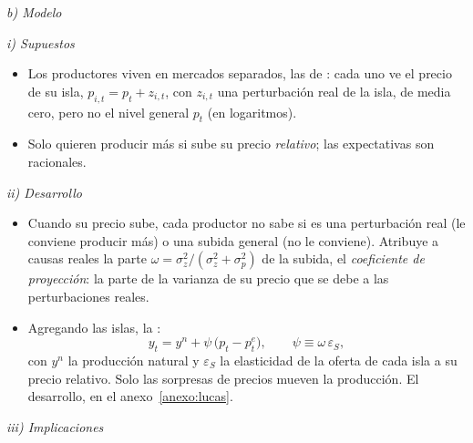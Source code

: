 \documentclass[11pt]{article}
\begin{document}
\hspace*{4.8em}\emph{b) Modelo}

\hspace*{6em}\emph{i) Supuestos}

\begin{itemize}
\item Los productores viven en mercados separados, las  de \textcite{Phelps1970Microeconomic}: cada uno ve el precio de su isla, $p_{i,t}=p_t+z_{i,t}$, con $z_{i,t}$ una perturbación real de la isla, de media cero, pero no el nivel general $p_t$ (en logaritmos).
\item Solo quieren producir más si sube su precio \emph{relativo}; las expectativas son racionales.
\end{itemize}

\hspace*{6em}\emph{ii) Desarrollo}

\begin{itemize}
\item Cuando su precio sube, cada productor no sabe si es una perturbación real (le conviene producir más) o una subida general (no le conviene). Atribuye a causas reales la parte $\omega=\sigma^2_z/(\sigma^2_z+\sigma^2_p)$ de la subida, el \emph{coeficiente de proyección}: la parte de la varianza de su precio que se debe a las perturbaciones reales.
\item Agregando las islas, la \nocite{Lucas1973Some}:
  \begin{equation}\label{eq:oferta-lucas}
  y_t=y^n+\psi\,\big(p_t-p^e_t\big),\qquad\psi\equiv\omega\,\varepsilon_S ,
  \end{equation}
  con $y^n$ la producción natural y $\varepsilon_S$ la elasticidad de la oferta de cada isla a su precio relativo. Solo las sorpresas de precios mueven la producción. El desarrollo, en el anexo~\ref{anexo:lucas}.
\end{itemize}

\hspace*{6em}\emph{iii) Implicaciones}
\end{document}

